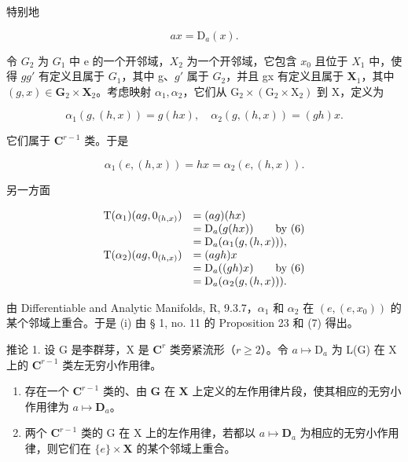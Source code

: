 特别地

\[
a x = \mathrm{D} _ {a} (x).\tag{7}
\]

令 \(G_{2}\) 为 \(G_{1}\) 中 e 的一个开邻域，\(X_{2}\) 为一个开邻域，它包含 \(x_{0}\) 且位于 \(X_{1}\) 中，使得 \(gg'\) 有定义且属于 \(G_{1}\)，其中 g、\(g'\) 属于 \(G_{2}\)，并且 gx 有定义且属于 \(\mathbf{X}_1\)，其中 \((g,x)\in \mathbf{G}_2\times \mathbf{X}_2\)。考虑映射 \(\alpha_{1},\alpha_{2}\)，它们从 \(\mathrm{G}_2\times (\mathrm{G}_2\times \mathrm{X}_2)\) 到 X，定义为

\[
\alpha_ {1} (g, (h, x)) = g (h x), \quad \alpha_ {2} (g, (h, x)) = (g h) x.
\]

它们属于 \(\mathbf{C}^{r - 1}\) 类。于是

\[
\alpha_ {1} (e, (h, x)) = h x = \alpha_ {2} (e, (h, x)).
\]

另一方面

\[
\begin{array}{r l} \mathrm{T} (\alpha_ {1}) (a g, 0 _ {(h, x)}) & = (a g) (h x) \\ & = \mathrm{D} _ {a} (g (h x)) \qquad \text {by (6)} \\ & = \mathrm{D} _ {a} (\alpha_ {1} (g, (h, x))), \\ \mathrm{T} (\alpha_ {2}) (a g, 0 _ {(h, x)}) & = (a g h) x \\ & = \mathrm{D} _ {a} ((g h) x) \qquad \text {by (6)} \\ & = \mathrm{D} _ {a} (\alpha_ {2} (g, (h, x))). \end{array}
\]

由 Differentiable and Analytic Manifolds, R, 9.3.7，\(\alpha_{1}\) 和 \(\alpha_{2}\) 在 \((e, (e, x_{0}))\) 的某个邻域上重合。于是 (i) 由 § 1, no. 11 的 Proposition 23 和 (7) 得出。

推论 1. 设 G 是李群芽，X 是 \(\mathbf{C}^r\) 类旁紧流形（\(r \geqslant 2\)）。令 \(a \mapsto \mathrm{D}_a\) 为 L(G) 在 X 上的 \(\mathbf{C}^{r-1}\) 类左无穷小作用律。

\begin{enumerate}
\def\labelenumi{(\roman{enumi})}
\item
  存在一个 \(\mathbf{C}^{r-1}\) 类的、由 \(\mathbf{G}\) 在 \(\mathbf{X}\) 上定义的左作用律片段，使其相应的无穷小作用律为 \(a \mapsto \mathbf{D}_a\)。
\item
  两个 \(\mathbf{C}^{r-1}\) 类的 G 在 X 上的左作用律，若都以 \(a \mapsto \mathbf{D}_a\) 为相应的无穷小作用律，则它们在 \(\{e\} \times \mathbf{X}\) 的某个邻域上重合。
\end{enumerate}

